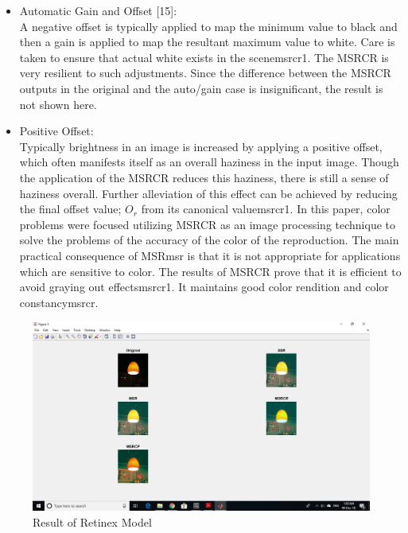 \begin{itemize}
	\item Automatic Gain and Offset [15]:\\
	A negative offset is typically applied to map the
minimum value to black and then a gain is applied to
map the resultant maximum value to white. Care is taken
to ensure that actual white exists in the scene{msrcr1}. The
MSRCR is very resilient to such adjustments. Since the
difference between the MSRCR outputs in the original
and the auto/gain case is insignificant, the result is not
shown here.

\end{itemize}

\begin{itemize}
	\item Positive Offset:\\
	Typically brightness in an image is increased by applying
a positive offset, which often manifests itself as an
overall haziness in the input image. Though the
application of the MSRCR reduces this haziness, there is
still a sense of haziness overall. Further alleviation of this
effect can be achieved by reducing the final offset value;
$O_{r}$ from its canonical value{msrcr1}.
In this paper, color problems were focused utilizing
MSRCR as an image processing technique to solve the
problems of the accuracy of the color of the reproduction.
The main practical consequence of MSR{msr} is that it is not
appropriate for applications which are sensitive to color.
The results of MSRCR prove that it is efficient to avoid
graying out effects{msrcr1}. It maintains good color rendition and
color constancy{msrcr}.
\end{itemize}

\begin{figure}
	\includegraphics[scale=0.5]{images/ch3/retinexModel.jpg}
	\caption{Result of Retinex Model}
\end{figure}

